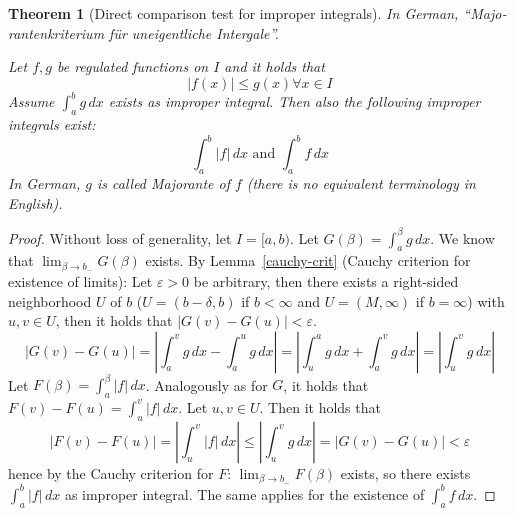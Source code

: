 \documentclass{article}
\newtheorem{theorem}{Theorem}  \numberwithin{theorem}{section}
\newcommand{\card}[1]{\left|#1\right|}
\begin{document}
\begin{theorem}[Direct comparison test for improper integrals] %
  \label{dctii}
  In German, \enquote{\foreignlanguage{german}{Majorantenkriterium f\"ur uneigentliche Intergale}}.

  Let $f, g$ be regulated functions on $I$ and it holds that
  \[ \card{f(x)} \leq g(x) \forall x \in I \]
  Assume $\int_a^b g \, dx$ exists as improper integral. Then also the following improper integrals exist:
  \[ \int_a^b \card{f} \, dx \text{ and } \int_a^b f \, dx \]
  In German, $g$ is called \foreignlanguage{german}{Majorante} of $f$ (there is no equivalent terminology in English).
\end{theorem}

\begin{proof}
  Without loss of generality, let $I = [a,b)$.
  Let $G(\beta) = \int_a^\beta g \, dx$. We know that $\lim_{\beta \to b_-} G(\beta)$ exists.
  By Lemma~\ref{cauchy-crit} (Cauchy criterion for existence of limits):
  Let $\varepsilon > 0$ be arbitrary, then there exists a right-sided neighborhood $U$ of $b$
  ($U = (b - \delta, b)$ if $b < \infty$ and $U = (M, \infty)$ if $b = \infty$)
  with $u,v \in U$, then it holds that $\card{G(v) - G(u)} < \varepsilon$.
  \[
    \card{G(v) - G(u)} = \card{\int_a^v g \, dx - \int_a^u g \, dx}
      = \card{\int_u^a g \, dx + \int_a^v g \, dx}
      = \card{\int_u^v g \, dx}
  \]
  Let $F(\beta) = \int_a^\beta \card{f} \, dx$.
  Analogously as for $G$, it holds that $F(v) - F(u) = \int_u^v \card{f} \, dx$.
  Let $u,v \in U$. Then it holds that
  \[
    \card{F(v) - F(u)} = \card{\int_u^v \card{f} \, dx} \leq \card{\int_u^v g \, dx}
      = \card{G(v) - G(u)} < \varepsilon
  \]
  hence by the Cauchy criterion for $F$:
  $\lim_{\beta\to b_-} F(\beta)$ exists, so there exists $\int_a^b \card{f} \, dx$ as improper integral.
  The same applies for the existence of $\int_a^b f \, dx$.
\end{proof}
\end{document}
